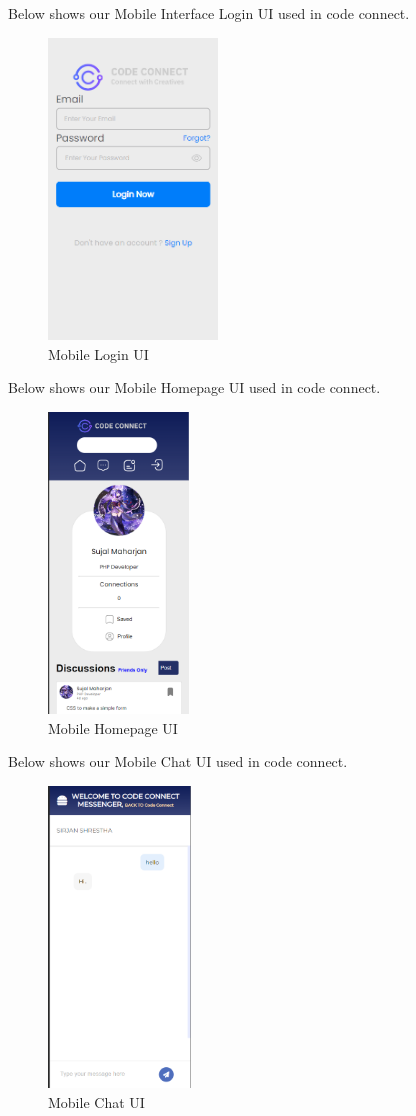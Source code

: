 Below shows our Mobile Interface Login UI used in code connect.
\begin{figure}[H]
  \centering
  \includegraphics[height = 8cm]{ui_diagrams/mobile_login.png}
  \caption{Mobile Login UI}
\end{figure}
\newpage
Below shows our Mobile Homepage UI used in code connect.
\begin{figure}[H]
  \centering
  \includegraphics[height = 8cm]{Outcome-ss/mobile-homepage.png}
  \caption{Mobile Homepage UI}
\end{figure}
Below shows our Mobile Chat UI used in code connect.
\begin{figure}[H]
  \centering
  \includegraphics[height = 8cm]{Outcome-ss/mobile-chat.png}
  \caption{Mobile Chat UI}
\end{figure}

